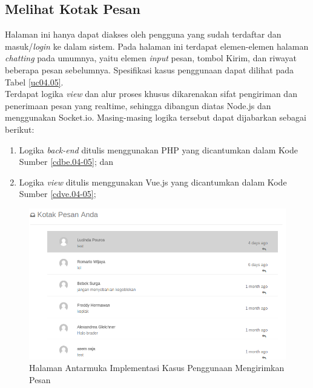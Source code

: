 \subsection{Melihat Kotak Pesan}

Halaman ini hanya dapat diakses oleh pengguna yang sudah terdaftar dan masuk/\textit{login} ke dalam sistem. Pada halaman ini terdapat elemen-elemen halaman \textit{chatting} pada umumnya, yaitu elemen \textit{input} pesan, tombol Kirim, dan riwayat beberapa pesan sebelumnya. Spesifikasi kasus penggunaan dapat dilihat pada Tabel \ref{uc04.05}.\\
\indent Terdapat logika \textit{view} dan alur proses khusus dikarenakan sifat pengiriman dan penerimaan pesan yang realtime, sehingga dibangun diatas Node.js dan menggunakan Socket.io. Masing-masing logika tersebut dapat dijabarkan sebagai berikut:
\begin{enumerate}
	\item Logika \textit{back-end} ditulis menggunakan PHP yang dicantumkan dalam Kode Sumber \ref{cdbe.04-05}; dan
	\item Logika \textit{view} ditulis menggunakan Vue.js yang dicantumkan dalam Kode Sumber \ref{cdve.04-05};
\end{enumerate}

\begin{figure}[H]
	\centering
	\includegraphics[width=\textwidth]{images/bab4/ui/04-05.png}
	\caption{Halaman Antarmuka Implementasi Kasus Penggunaan Mengirimkan Pesan}
	\label{ui.04-05}
\end{figure}

